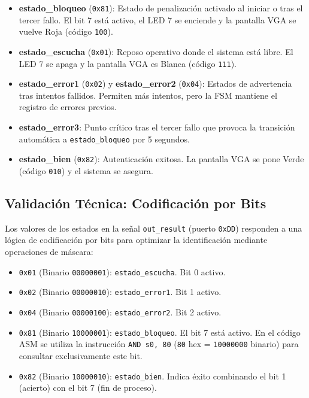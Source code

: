 \documentclass[a4paper, 12pt]{report}
\begin{document}
\begin{itemize}
    \item \textbf{estado\_bloqueo} (\texttt{0x81}): Estado de penalización activado al iniciar o tras el tercer fallo. El bit 7 está activo, el LED 7 se enciende y la pantalla VGA se vuelve Roja (código \texttt{100}).

    \item \textbf{estado\_escucha} (\texttt{0x01}): Reposo operativo donde el sistema está libre. El LED 7 se apaga y la pantalla VGA es Blanca (código \texttt{111}).

    \item \textbf{estado\_error1} (\texttt{0x02}) y \textbf{estado\_error2} (\texttt{0x04}): Estados de advertencia tras intentos fallidos. Permiten más intentos, pero la FSM mantiene el registro de errores previos.

    \item \textbf{estado\_error3}: Punto crítico tras el tercer fallo que provoca la transición automática a \texttt{estado\_bloqueo} por 5 segundos.

    \item \textbf{estado\_bien} (\texttt{0x82}): Autenticación exitosa. La pantalla VGA se pone Verde (código \texttt{010}) y el sistema se asegura.
\end{itemize}

\subsection{Validación Técnica: Codificación por Bits}

Los valores de los estados en la señal \texttt{out\_result} (puerto \texttt{0xDD}) responden a una lógica de codificación por bits para optimizar la identificación mediante operaciones de máscara:

\begin{itemize}
    \item \texttt{0x01} (Binario \texttt{00000001}): \texttt{estado\_escucha}. Bit 0 activo.
    \item \texttt{0x02} (Binario \texttt{00000010}): \texttt{estado\_error1}. Bit 1 activo.
    \item \texttt{0x04} (Binario \texttt{00000100}): \texttt{estado\_error2}. Bit 2 activo.
    \item \texttt{0x81} (Binario \texttt{10000001}): \texttt{estado\_bloqueo}. El bit 7 está activo. En el código ASM se utiliza la instrucción \texttt{AND s0, 80} (\texttt{80} hex = \texttt{10000000} binario) para consultar exclusivamente este bit.
    \item \texttt{0x82} (Binario \texttt{10000010}): \texttt{estado\_bien}. Indica éxito combinando el bit 1 (acierto) con el bit 7 (fin de proceso).
\end{itemize}
\end{document}
